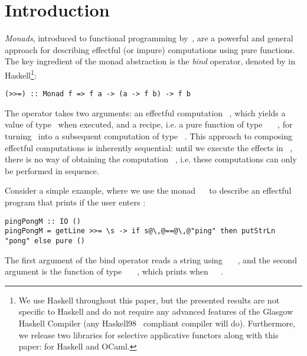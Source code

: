 \section{Introduction}\label{sec-intro}


\emph{Monads}, introduced to functional programming
by~\citet{1995_wadler_monads}, are a powerful and general approach for
describing effectful (or impure) computations using pure functions. The key
ingredient of the monad abstraction is the \emph{bind} operator, denoted by
\hs{>>=} in Haskell\footnote{We use Haskell throughout this paper, but the
presented results are not specific to Haskell and do not require any advanced
features of the Glasgow Haskell Compiler (any Haskell98~\citep{haskell98}
compliant compiler will do). Furthermore, we release two libraries for selective
applicative functors along with this paper: for Haskell and OCaml.}:

\vspace{1mm}
\begin{verbatim}
(>>=) :: Monad f => f a -> (a -> f b) -> f b
\end{verbatim}
\vspace{1mm}

\noindent
The operator takes two arguments: an effectful computation ~, which
yields a value of type~ when executed, and a recipe, i.e. a pure function
of type ~\hs{->}~~, for turning~ into a subsequent
computation of type ~. This approach to composing effectful
computations is inherently sequential: until we execute the effects in
~, there is no way of obtaining the computation ~,
i.e. these computations can only be performed in sequence.

Consider a simple example, where we use the monad ~\hs{=}~ to
describe an effectful program that prints  if the user enters
:

\vspace{1mm}
\begin{verbatim}
pingPongM :: IO ()
pingPongM = getLine >>= \s -> if s@\,@==@\,@"ping" then putStrLn "pong" else pure ()
\end{verbatim}
\vspace{1mm}

\noindent
The first argument of the bind operator reads a string using
~\hs{::}~~, and the second argument is the
function of type ~\hs{->}~~\hs{()}, which prints 
when~~\hs{==}~.

